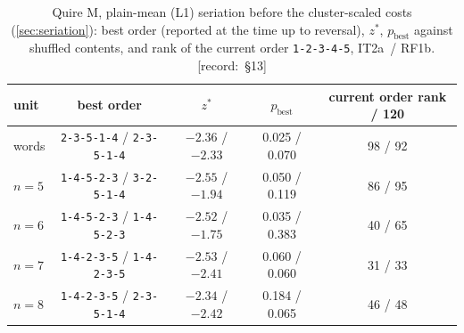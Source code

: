 \documentclass[11pt,a4paper]{article}
\newcommand{\src}[1]{{\footnotesize\color{muted}\sffamily\mbox{[record: \S#1]}}}
\newcommand{\IT}{\textcolor{it2a}{IT2a}}
\newcommand{\RF}{\textcolor{rf1b}{RF1b}}
\newcommand{\order}[1]{\texttt{#1}}
\begin{document}
\begin{table}[H]
\centering\small
\caption{Quire M, plain-mean (L1) seriation before the cluster-scaled costs (\cref{sec:seriation}): best order (reported at the time up to reversal), $z^\ast$, $p_{\text{best}}$ against shuffled contents, and rank of the current order \order{1-2-3-4-5}, \IT\ / \RF. \src{13}}
\label{tab:ML1}
\begin{tabular}{@{}lcccc@{}}
\toprule
unit & best order & $z^\ast$ & $p_{\text{best}}$ & current order rank / 120\\
\midrule
words & \order{2-3-5-1-4} / \order{2-3-5-1-4} & $-2.36$ / $-2.33$ & 0.025 / 0.070 & 98 / 92\\
$n=5$ & \order{1-4-5-2-3} / \order{3-2-5-1-4} & $-2.55$ / $-1.94$ & 0.050 / 0.119 & 86 / 95\\
$n=6$ & \order{1-4-5-2-3} / \order{1-4-5-2-3} & $-2.52$ / $-1.75$ & 0.035 / 0.383 & 40 / 65\\
$n=7$ & \order{1-4-2-3-5} / \order{1-4-2-3-5} & $-2.53$ / $-2.41$ & 0.060 / 0.060 & 31 / 33\\
$n=8$ & \order{1-4-2-3-5} / \order{2-3-5-1-4} & $-2.34$ / $-2.42$ & 0.184 / 0.065 & 46 / 48\\
\bottomrule
\end{tabular}
\end{table}
\end{document}

